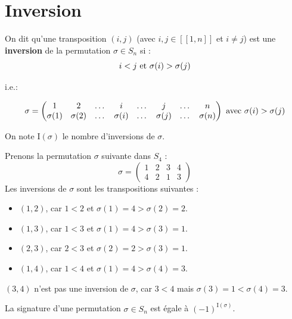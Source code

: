 \documentclass[12pt, a4paper]{report}
\begin{document}
\section{Inversion}

\begin{definition}
    On dit qu'une transposition $(i,j)$ (avec $i,j \in [\![1,n]\!]$ et $i \ne j$) est une \textbf{inversion} de la permutation $\sigma \in S_n$ si :
    $$i < j \text{ et } \sigma(i) > \sigma(j)$$

    i.e.:

    $$\sigma = \left(\begin{matrix} 1 & 2 & \dots & i & \dots & j & \dots & n \\ \sigma(1) & \sigma(2) & \dots & \sigma(i) & \dots & \sigma(j) & \dots & \sigma(n) \end{matrix}\right) \text{ avec } \sigma(i) > \sigma(j)$$

    On note $\mathrm{I}(\sigma)$ le nombre d'inversions de $\sigma$.
\end{definition}

\begin{example}
    Prenons la permutation $\sigma$ suivante dans $S_4$ :
    $$\sigma = \left(\begin{matrix} 1 & 2 & 3 & 4 \\ 4 & 2 & 1 & 3 \end{matrix}\right)$$
    Les inversions de $\sigma$ sont les transpositions suivantes :
    \begin{itemize}
        \item $(1,2)$, car $1 < 2$ et $\sigma(1) = 4 > \sigma(2) = 2$.
        \item $(1,3)$, car $1 < 3$ et $\sigma(1) = 4 > \sigma(3) = 1$.
        \item $(2,3)$, car $2 < 3$ et $\sigma(2) = 2 > \sigma(3) = 1$.
        \item $(1,4)$, car $1 < 4$ et $\sigma(1) = 4 > \sigma(4) = 3$.
    \end{itemize}
    $(3,4)$ n'est pas une inversion de $\sigma$, car $3 < 4$ mais $\sigma(3) = 1 < \sigma(4) = 3$.
\end{example}

\begin{property}
    La signature d'une permutation $\sigma \in S_n$ est égale à $(-1)^{\mathrm{I}(\sigma)}$.
\end{property}
\end{document}
